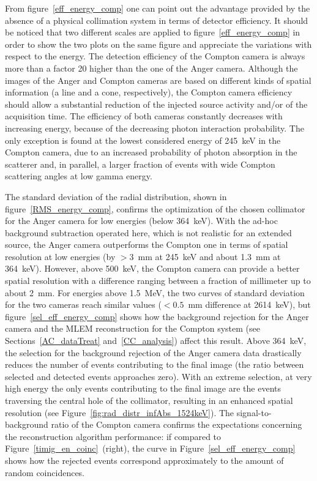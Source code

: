 From figure~\ref{eff_energy_comp} one can point out the advantage provided by the absence of a physical collimation system in terms of detector efficiency. It should be noticed that two different scales are applied to figure~\ref{eff_energy_comp} in order to show the two plots on the same figure and appreciate the variations with respect to the energy. The detection efficiency of the Compton camera is always more than a factor 20 higher than the one of the Anger camera. Although the images of the Anger and Compton cameras are based on different kinds of spatial information (a line and a cone, respectively), the Compton camera efficiency should allow a substantial reduction of the injected source activity and/or of the acquisition time. The efficiency of both cameras constantly decreases with increasing energy, because of the decreasing photon interaction probability. The only exception is found at the lowest considered energy of 245~keV in the Compton camera, due to an increased  probability of photon absorption in the scatterer and, in parallel, a larger fraction of events with wide Compton scattering angles at low gamma energy.

The standard deviation of the radial distribution, shown in figure~\ref{RMS_energy_comp}, confirms the optimization of the chosen collimator for the Anger camera for low energies (below 364~keV). With the ad-hoc background subtraction operated here, which is not realistic for an extended source, the Anger camera outperforms the Compton one in terms of spatial resolution at low energies (by $>3$~mm at 245~keV and about 1.3~mm at 364~keV). However, above 500~keV, the Compton camera can provide a better spatial resolution with a difference ranging between a fraction of millimeter up to about 2~mm. For energies above 1.5~MeV, the two curves of standard deviation for the two cameras reach similar values ($<0.5$~mm difference at 2614~keV), but figure~\ref{sel_eff_energy_comp} shows how the background rejection for the Anger camera and the MLEM reconstruction for the Compton system (see Sections~\ref{AC_dataTreat} and~\ref{CC_analysis}) affect this result. Above 364~keV, the selection for the background rejection of the Anger camera data drastically reduces the number of events contributing to the final image (the ratio between selected and detected events approaches zero). With an extreme selection, at very high energy the only events contributing to the final image are the events traversing the central hole of the collimator, resulting in an enhanced spatial resolution (see Figure~\ref{fig:rad_distr_infAbs_1524keV}). The signal-to-background ratio of the Compton camera confirms the expectations concerning the reconstruction algorithm performance: if compared to Figure~\ref{timig_en_coinc}~(right), the curve in Figure~\ref{sel_eff_energy_comp} shows how the rejected events correspond approximately to the amount of random coincidences.
              


